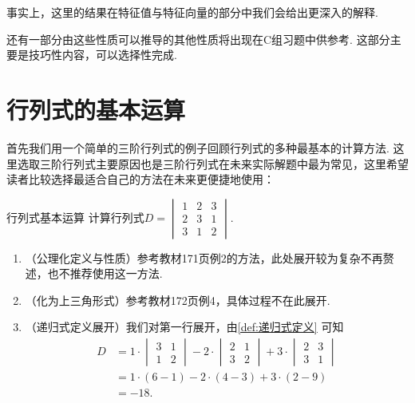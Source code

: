 \begin{enumerate}
          事实上，这里的结果在特征值与特征向量的部分中我们会给出更深入的解释.
\end{enumerate}

还有一部分由这些性质可以推导的其他性质将出现在C组习题中供参考. 这部分主要是技巧性内容，可以选择性完成.

\section{行列式的基本运算}

首先我们用一个简单的三阶行列式的例子回顾行列式的多种最基本的计算方法. 这里选取三阶行列式主要原因也是三阶行列式在未来实际解题中最为常见，这里希望读者比较选择最适合自己的方法在未来更便捷地使用：
\begin{example}{}{行列式基本运算}
    计算行列式$D=\begin{vmatrix}
            1 & 2 & 3 \\
            2 & 3 & 1 \\
            3 & 1 & 2
        \end{vmatrix}$.
\end{example}

\begin{solution}
    \begin{enumerate}
        \item （公理化定义与性质）参考教材171页例2的方法，此处展开较为复杂不再赘述，也不推荐使用这一方法.

        \item （化为上三角形式）参考教材172页例4，具体过程不在此展开.

        \item （递归式定义展开）我们对第一行展开，由\autoref{def:递归式定义} 可知
              \begin{align*}
                  D & =1 \cdot
                  \begin{vmatrix}
                      3 & 1 \\
                      1 & 2
                  \end{vmatrix} - 2
                  \cdot \begin{vmatrix}
                            2 & 1 \\
                            3 & 2
                        \end{vmatrix}+3
                  \cdot \begin{vmatrix}
                            2 & 3 \\
                            3 & 1
                        \end{vmatrix}                           \\
                    & =1 \cdot (6-1)-2 \cdot (4-3)+3 \cdot (2-9) \\
                    & =-18.
              \end{align*}
    \end{enumerate}
\end{solution}

